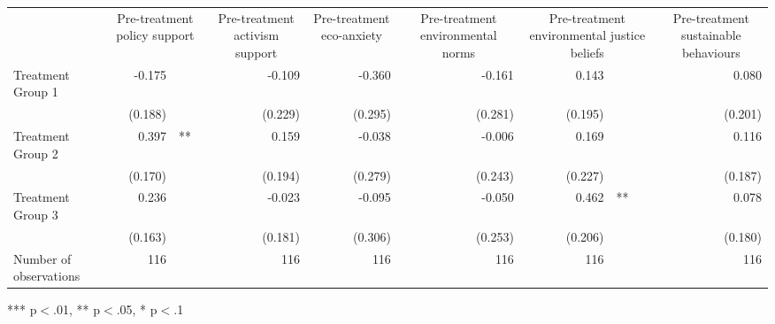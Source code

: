 \documentclass{article}
\begin{document}
\begin{table}[!h]
\centering
\begin{tabular}{lllllllll}
\cline{1-9}
\multicolumn{1}{r}{} &
  \multicolumn{2}{c}{Pre-treatment policy support} &
  \multicolumn{1}{c}{Pre-treatment activism support} &
  \multicolumn{1}{c}{Pre-treatment eco-anxiety} &
  \multicolumn{1}{c}{Pre-treatment environmental norms} &
  \multicolumn{2}{c}{Pre-treatment environmental justice beliefs} &
  \multicolumn{1}{c}{Pre-treatment sustainable behaviours} \\
\cline{1-9}
\multicolumn{1}{l}{Treatment Group 1} &
  \multicolumn{1}{r}{-0.175} &
  \multicolumn{1}{l}{} &
  \multicolumn{1}{r}{-0.109} &
  \multicolumn{1}{r}{-0.360} &
  \multicolumn{1}{r}{-0.161} &
  \multicolumn{1}{r}{0.143} &
  \multicolumn{1}{l}{} &
  \multicolumn{1}{r}{0.080} \\
\multicolumn{1}{l}{} &
  \multicolumn{1}{r}{(0.188)} &
  \multicolumn{1}{l}{} &
  \multicolumn{1}{r}{(0.229)} &
  \multicolumn{1}{r}{(0.295)} &
  \multicolumn{1}{r}{(0.281)} &
  \multicolumn{1}{r}{(0.195)} &
  \multicolumn{1}{l}{} &
  \multicolumn{1}{r}{(0.201)} \\
\multicolumn{1}{l}{Treatment Group 2} &
  \multicolumn{1}{r}{0.397} &
  \multicolumn{1}{l}{**} &
  \multicolumn{1}{r}{0.159} &
  \multicolumn{1}{r}{-0.038} &
  \multicolumn{1}{r}{-0.006} &
  \multicolumn{1}{r}{0.169} &
  \multicolumn{1}{l}{} &
  \multicolumn{1}{r}{0.116} \\
\multicolumn{1}{l}{} &
  \multicolumn{1}{r}{(0.170)} &
  \multicolumn{1}{l}{} &
  \multicolumn{1}{r}{(0.194)} &
  \multicolumn{1}{r}{(0.279)} &
  \multicolumn{1}{r}{(0.243)} &
  \multicolumn{1}{r}{(0.227)} &
  \multicolumn{1}{l}{} &
  \multicolumn{1}{r}{(0.187)} \\
\multicolumn{1}{l}{Treatment Group 3} &
  \multicolumn{1}{r}{0.236} &
  \multicolumn{1}{l}{} &
  \multicolumn{1}{r}{-0.023} &
  \multicolumn{1}{r}{-0.095} &
  \multicolumn{1}{r}{-0.050} &
  \multicolumn{1}{r}{0.462} &
  \multicolumn{1}{l}{**} &
  \multicolumn{1}{r}{0.078} \\
\multicolumn{1}{l}{} &
  \multicolumn{1}{r}{(0.163)} &
  \multicolumn{1}{l}{} &
  \multicolumn{1}{r}{(0.181)} &
  \multicolumn{1}{r}{(0.306)} &
  \multicolumn{1}{r}{(0.253)} &
  \multicolumn{1}{r}{(0.206)} &
  \multicolumn{1}{l}{} &
  \multicolumn{1}{r}{(0.180)} \\
\multicolumn{1}{l}{Number of observations} &
  \multicolumn{1}{r}{116} &
  \multicolumn{1}{l}{} &
  \multicolumn{1}{r}{116} &
  \multicolumn{1}{r}{116} &
  \multicolumn{1}{r}{116} &
  \multicolumn{1}{r}{116} &
  \multicolumn{1}{l}{} &
  \multicolumn{1}{r}{116} \\
\cline{1-9}
\end{tabular}

\footnotesize{
*** p$<$.01, ** p$<$.05, * p$<$.1
}
\end{table}
\end{document}
